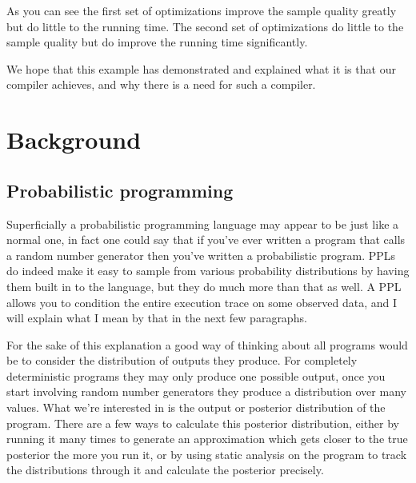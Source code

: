 \documentclass[a4paper]{article}
\begin{document}
As you can see the first set of optimizations improve the sample quality greatly but do little to the running time. The second set of optimizations do little to the sample quality but do improve the running time significantly.

We hope that this example has demonstrated and explained what it is that our compiler achieves, and why there is a need for such a compiler.




\section{Background}




\subsection{Probabilistic programming}

Superficially a probabilistic programming language may appear to be just like a normal one, in fact one could say that if you've ever written a program that calls a random number generator then you've written a probabilistic program. PPLs do indeed make it easy to sample from various probability distributions by having them built in to the language, but they do much more than that as well. A PPL allows you to condition the entire execution trace on some observed data, and I will explain what I mean by that in the next few paragraphs.

For the sake of this explanation a good way of thinking about all programs would be to consider the distribution of outputs they produce. For completely deterministic programs they may only produce one possible output, once you start involving random number generators they produce a distribution over many values. What we're interested in is the output or posterior distribution of the program. There are a few ways to calculate this posterior distribution, either by running it many times to generate an approximation which gets closer to the true posterior the more you run it, or by using static analysis on the program to track the distributions through it and calculate the posterior precisely.
\end{document}
